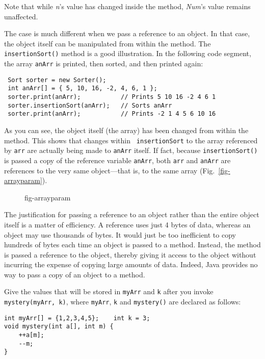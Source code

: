 \noindent Note that while {\it n}'s value has changed inside the
method, {\it Num}'s value remains unaffected.

The case is much different when we pass a reference to an object.  In
that case, the object itself can be manipulated from within the
method.  The {\tt insertionSort()} method is a good illustration.  In
the following code
segment, the array {\tt anArr} is printed, then sorted, and then printed
again:

\begin{jjjlisting}
\begin{lstlisting}
 Sort sorter = new Sorter();
 int anArr[] = { 5, 10, 16, -2, 4, 6, 1 }; 
 sorter.print(anArr);           // Prints 5 10 16 -2 4 6 1
 sorter.insertionSort(anArr);   // Sorts anArr
 sorter.print(anArr);           // Prints -2 1 4 5 6 10 16
\end{lstlisting}
\end{jjjlisting}

\noindent As you can see, the object itself (the array) has been
changed from within the method. This shows that changes within {\tt
insertionSort} to the array referenced by {\tt arr} are actually being
made to {\tt anArr} itself.  If fact, because {\tt insertionSort()} is
passed a copy of the reference variable {\tt anArr}, both {\tt arr}
and {\tt anArr} are references to the very same object---that is, to
the same array (Fig.~\ref{fig-arrayparam}).

\begin{figure}[tbh]
 {fig-arrayparam}
\end{figure}

The justification for passing a reference to an object rather than the
entire object itself is a matter of efficiency.  A reference uses just
4 bytes of data, whereas an object may use thousands of bytes.   It
would just be too inefficient to copy hundreds of bytes each time an
object is passed to a method.  Instead, the method is passed a
reference to the object, thereby giving it access to the object
without incurring the expense of copying large amounts of data.
Indeed, Java provides no way to pass a copy of an object to a method.

\begin{SSTUDY}

\item Give the values that will be stored in {\tt myArr} and {\tt k}
after you invoke {\tt mystery(myArr, k)}, where {\tt myArr}, {\tt k}
and {\tt mystery()} are declared as follows:

\begin{jjjlisting}
\begin{lstlisting}
int myArr[] = {1,2,3,4,5};    int k = 3;
void mystery(int a[], int m) {
    ++a[m];
    --m;
}
\end{lstlisting}
\end{jjjlisting}

\end{SSTUDY}

